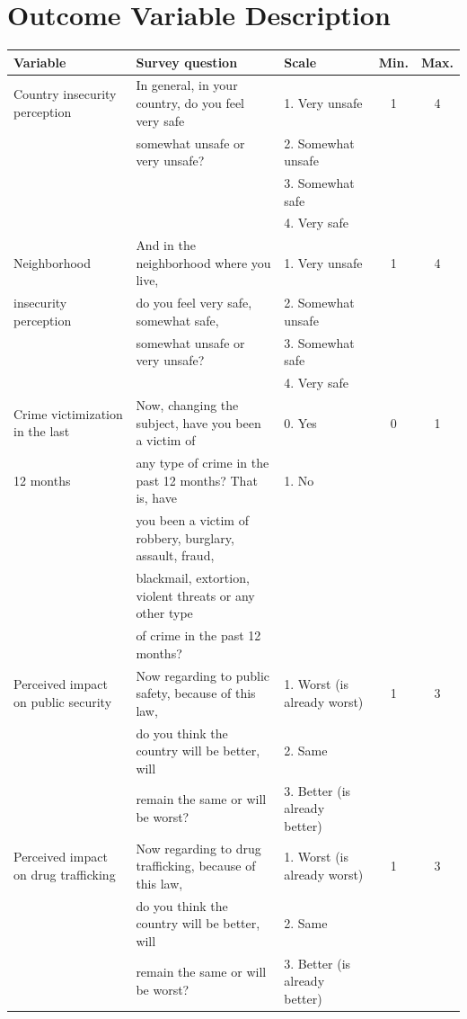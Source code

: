 \documentclass[11pt]{article}
\begin{document}
\section{Outcome Variable Description}
\begin{tiny}
\begin{tabular}{lllcc}
\textbf{Variable }	&	\textbf{Survey question} 	&	\textbf{Scale}	&	\textbf{Min.}	&	\textbf{Max.}		\\	\hline
Country insecurity  perception	&	In general, in your country, do you feel very safe	&	1. Very unsafe 	&	1	&	4	\\
	&	somewhat unsafe or very unsafe?	&	2. Somewhat unsafe 	&		&		\\
	&		&	3. Somewhat safe 	&		&		\\
	&		&	4. Very safe 	&		&		\\\hline
Neighborhood 	&	And in the neighborhood where you live, 	&	1. Very unsafe 	&	1	&	4	\\
insecurity perception	&	do you feel very safe, somewhat safe,	&	2. Somewhat unsafe 	&		&		\\
	&	somewhat unsafe or very unsafe?	&	3. Somewhat safe 	&		&		\\
	&		&	4. Very safe 	&		&		\\\hline
Crime victimization in the last 	&	Now, changing the subject, have you been a victim of 	&	0. Yes	&	0	&	1	\\
12 months	&	any type of crime in the past 12 months? That is, have	&	1. No 	&		&		\\
	&	you been a victim of robbery, burglary, assault, fraud,	&		&		&		\\
	&	blackmail, extortion, violent threats or any other type	&		&		&		\\
	&	of crime in the past 12 months?	&		&		&		\\\hline
Perceived impact on public security	&	Now regarding to public safety, because of this law,	&	1.  Worst (is already worst)	&	1	&	3	\\
	&	 do you think the country will be better, will 	&	2. Same	&		&		\\
	&	remain the same or will be worst?	&	3. Better (is already better)	&		&		\\\hline
Perceived impact on drug trafficking	&	Now regarding to drug trafficking, because of this law,	&	1.  Worst (is already worst)	&	1	&	3	\\
	&	 do you think the country will be better, will 	&	2. Same	&		&		\\
	&	remain the same or will be worst?	&	3. Better (is already better)	&		&		\\\hline

\end{tabular}
\end{tiny}
\end{document}
